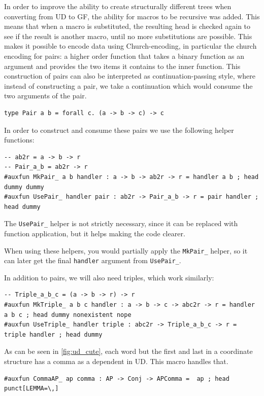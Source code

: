 In order to improve the ability to create structurally different trees when converting from UD to GF, the ability for macros to be recursive was added.
This means that when a macro is substituted, the resulting head is checked again to see if the result is another macro, until no more substitutions are possible.
This makes it possible to encode data using Church-encoding, in particular the church encoding for pairs: a higher order function that takes a binary function as an argument and provides the two items it contains to the inner function.
This construction of pairs can also be interpreted as continuation-passing style, where instead of constructing a pair, we take a continuation which would consume the two arguments of the pair.

\begin{verbatim}
type Pair a b = forall c. (a -> b -> c) -> c
\end{verbatim}

In order to construct and consume these pairs we use the following helper functions:
\begin{lstlisting}
-- ab2r = a -> b -> r
-- Pair_a_b = ab2r -> r
#auxfun MkPair_ a b handler : a -> b -> ab2r -> r = handler a b ; head dummy dummy
#auxfun UsePair_ handler pair : ab2r -> Pair_a_b -> r = pair handler ; head dummy
\end{lstlisting}
The \verb|UsePair_| helper is not strictly necessary, since it can be replaced with function application, but it helps making the code clearer.

When using these helpers, you would partially apply the \verb|MkPair_| helper, so it can later get the final \verb|handler| argument from \verb|UsePair_|.


In addition to pairs, we will also need triples, which work similarly:
\begin{lstlisting}
-- Triple_a_b_c = (a -> b -> r) -> r
#auxfun MkTriple_ a b c handler : a -> b -> c -> abc2r -> r = handler a b c ; head dummy nonexistent nope
#auxfun UseTriple_ handler triple : abc2r -> Triple_a_b_c -> r = triple handler ; head dummy
\end{lstlisting}

As can be seen in \autoref{fig:ud_cute}, each word but the first and last in a coordinate structure has a comma as a dependent in UD. This macro handles that.
\begin{lstlisting}
#auxfun CommaAP_ ap comma : AP -> Conj -> APComma =  ap ; head punct[LEMMA=\,]
\end{lstlisting}

